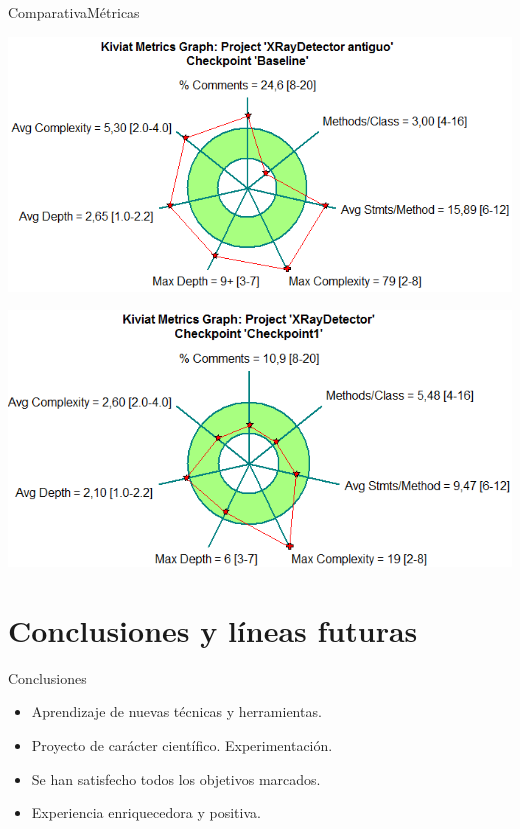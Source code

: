 \documentclass[10pt]{beamer}
\begin{document}
\begin{frame}{Comparativa}{Métricas}

\begin{block}
{\centering \includegraphics[scale=0.4]{AAUgraphics/kiviat2.png}\par}

{\centering \includegraphics[scale=0.4]{AAUgraphics/kiviat1.png}\par}
\end{block}

\end{frame}


\section{Conclusiones y líneas futuras}
\begin{frame}{Conclusiones}
\begin{itemize}
\item Aprendizaje de nuevas técnicas y herramientas.\newline


\item Proyecto de carácter científico. Experimentación.\newline


\item Se han satisfecho todos los objetivos marcados.\newline


\item Experiencia enriquecedora y positiva.
\end{itemize}

\end{frame}
\end{document}
